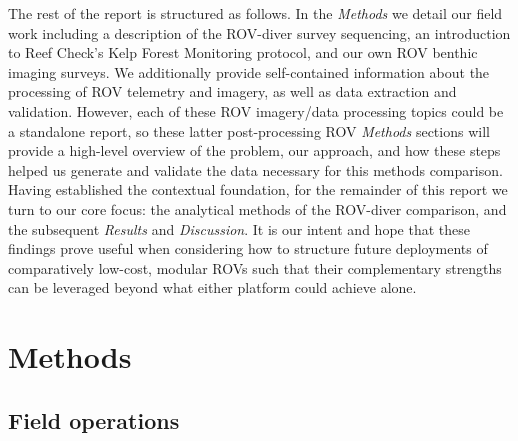 \documentclass[11pt]{article}
\begin{document}
The rest of the report is structured as follows.
In the \textit{Methods} we detail our field work including a description of the 
ROV-diver survey sequencing, an introduction to Reef Check's Kelp Forest 
Monitoring protocol, and our own ROV benthic imaging surveys. 
We additionally provide self-contained information about the processing of ROV 
telemetry and imagery, as well as data extraction and validation.
However, each of these ROV imagery/data processing topics could be a standalone 
report, so these latter post-processing ROV \textit{Methods} sections will 
provide a high-level overview of the problem, our approach, and how these steps 
helped us generate and validate the data necessary for this methods comparison. 
Having established the contextual foundation, for the remainder of this 
report we turn to our core focus: the analytical methods of the ROV-diver 
comparison, and the subsequent \textit{Results} and \textit{Discussion}. 
It is our intent and hope that these findings prove useful when considering how 
to structure future deployments of comparatively low-cost, modular ROVs such 
that their complementary strengths can be leveraged beyond what either platform 
could achieve alone.

\section{Methods}
\label{sec:methods}

\subsection{Field operations}
\label{subsec:field_ops}
\end{document}
